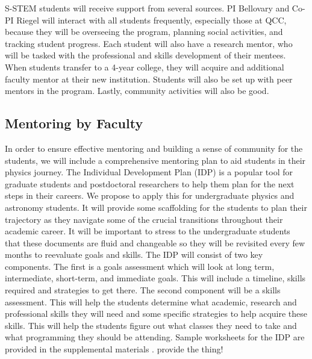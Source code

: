 \documentclass[12pt]{article}
\newcommand\new[1]{{\color{blue}#1}}
\begin{document}

S-STEM students will receive support from several sources.  PI Bellovary and Co-PI Riegel will interact with all students frequently, especially those at QCC, because they will be overseeing the program, planning social activities, and tracking student progress.  Each student will also have a research mentor, who will be tasked with the professional and skills development of their mentees.  When students transfer to a 4-year college, they will acquire and additional faculty mentor at their new institution.  Students will also be set up with peer mentors in the program.  Lastly, community activities will \new{also be good.}

\subsection{Mentoring by Faculty}

In order to ensure effective mentoring and building a sense of community for the students, we will include a comprehensive mentoring plan to aid students in their physics journey.  The Individual Development Plan (IDP) is a popular tool for graduate students and postdoctoral researchers to help them plan for the next steps in their careers. We propose to apply this for undergraduate physics and astronomy students.  It will provide some scaffolding for the students to plan their trajectory as they navigate some of the crucial transitions throughout their academic career.  It will be important to stress to the undergraduate students that these documents are fluid and changeable so they will be revisited every few months to reevaluate goals and skills.  The IDP will consist of two key components.  The first is a goals assessment which will look at long term, intermediate, short-term, and immediate goals. This will include a timeline, skills required and strategies to get there. The second component will be a skills assessment.  This will help the students determine what academic, research and professional skills they will need and some specific strategies to help acquire these skills. This will help the students figure out what classes they need to take and what programming they should be attending. Sample worksheets for the IDP are provided in the supplemental materials \citep{Bosch}.  \new{provide the thing!}
\end{document}
